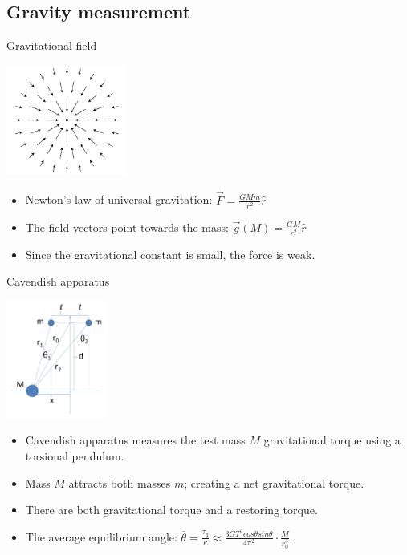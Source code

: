 \documentclass{beamer}
\begin{document}
\subsection{Gravity measurement}
\begin{frame}{Gravitational field}
	\begin{center}		
		\includegraphics[width=0.3\textwidth,keepaspectratio]{gravity.png}
    \end{center}
	\begin{itemize}
		\item Newton's law of universal gravitation: $\overrightarrow{F} = \frac{GMm}{r^2}\hat{r}$
		\item The field vectors point towards the mass: $\overrightarrow{g}(M) = \frac{GM}{r^2}\hat{r}$ 
		\item Since the gravitational constant is small, the force is weak.
		\end{itemize}
\end{frame}
\begin{frame}{Cavendish apparatus}
	\begin{center}		
		\includegraphics[width=0.25\textwidth,keepaspectratio]{Cavendish apparatus.PNG}
    \end{center}
	\begin{itemize}
		\item Cavendish apparatus measures the test mass $M$ gravitational torque using a torsional pendulum.
		\pause
		\item Mass $M$ attracts both masses $m$; creating a net gravitational torque.
		\item There are both gravitational torque and a restoring torque.
		\pause
		\item The average equilibrium angle: $\overline{\theta} = \frac{\tau_g}{\kappa} \approx \frac{3GT^2cos\theta sin\theta}{4\pi^2 } \cdot \frac{M}{r_0^3}$.

	\end{itemize}
\end{frame}
\end{document}

